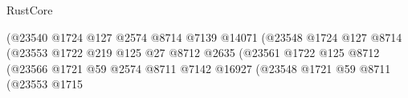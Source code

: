 \begin{lexlean}{RustCore}
\begin{coremodule}
                                                              (@23540
                                                                @1724
                                                                @127
                                                                @2574
                                                                @8714
                                                                @7139
                                                                @14071
                                                                (@23548
                                                                  @1724
                                                                  @127
                                                                  @8714
                                                                  (@23553
                                                                    @1722
                                                                    @219
                                                                    @125
                                                                    @27
                                                                    @8712
                                                                    @2635
                                                                    (@23561
                                                                      @1722
                                                                      @125
                                                                      @8712
                                                                      (@23566
                                                                        @1721
                                                                        @59
                                                                        @2574
                                                                        @8711
                                                                        @7142
                                                                        @16927
                                                                        (@23548
                                                                          @1721
                                                                          @59
                                                                          @8711
                                                                          (@23553
                                                                            @1715

\end{coremodule}
\end{lexlean}
